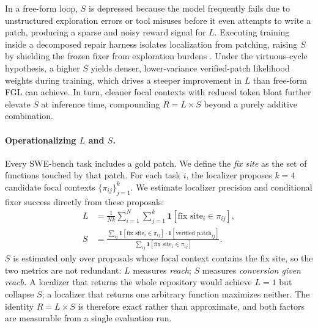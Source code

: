 \documentclass[11pt,a4paper]{article}
\begin{document}
In a free-form loop, $S$ is depressed because the model frequently fails due to unstructured exploration errors or tool misuses before it even attempts to write a patch, producing a sparse and noisy reward signal for $L$. Executing training inside a decomposed repair harness isolates localization from patching, raising $S$ by shielding the frozen fixer from exploration burdens \cite{LOOP}. Under the virtuous-cycle hypothesis, a higher $S$ yields denser, lower-variance verified-patch likelihood weights during training, which drives a steeper improvement in $L$ than free-form FGL can achieve. In turn, cleaner focal contexts with reduced token bloat further elevate $S$ at inference time, compounding $R = L \times S$ beyond a purely additive combination.

\paragraph{Operationalizing $L$ and $S$.}
Every SWE-bench task includes a gold patch. We define the \emph{fix site} as the set of functions touched by that patch. For each task $i$, the localizer proposes $k = 4$ candidate focal contexts $\{\pi_{ij}\}_{j=1}^{k}$. We estimate localizer precision and conditional fixer success directly from these proposals:
\begin{align}
    L &= \frac{1}{Nk}\sum_{i=1}^{N}\sum_{j=1}^{k} \mathbf{1}[\text{fix site}_i \in \pi_{ij}], \\
    S &= \frac{\sum_{ij} \mathbf{1}[\text{fix site}_i \in \pi_{ij}] \cdot \mathbf{1}[\text{verified patch}_{ij}]}{\sum_{ij} \mathbf{1}[\text{fix site}_i \in \pi_{ij}]}.
\end{align}
$S$ is estimated only over proposals whose focal context contains the fix site, so the two metrics are not redundant: $L$ measures \emph{reach}; $S$ measures \emph{conversion given reach}. A localizer that returns the whole repository would achieve $L = 1$ but collapse $S$; a localizer that returns one arbitrary function maximizes neither. The identity $R = L \times S$ is therefore exact rather than approximate, and both factors are measurable from a single evaluation run.
\end{document}
